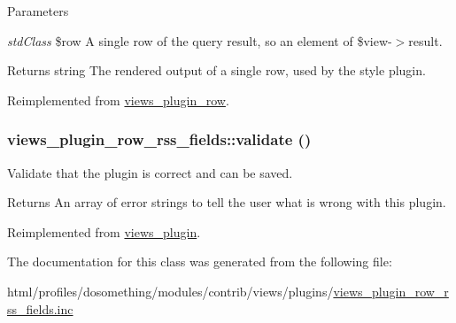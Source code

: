 \begin{DoxyParams}{Parameters}
\item[{\em stdClass}]\$row A single row of the query result, so an element of \$view-\/$>$result.\end{DoxyParams}
\begin{DoxyReturn}{Returns}
string The rendered output of a single row, used by the style plugin. 
\end{DoxyReturn}


Reimplemented from \hyperlink{classviews__plugin__row_a8243842e087dd28664b32cef0309f2a6}{views\_\-plugin\_\-row}.\hypertarget{classviews__plugin__row__rss__fields_ac4f5e75bc5a2277ed9041c18a3f2926d}{
\subsubsection[{validate}]{\setlength{\rightskip}{0pt plus 5cm}views\_\-plugin\_\-row\_\-rss\_\-fields::validate ()}}
\label{classviews__plugin__row__rss__fields_ac4f5e75bc5a2277ed9041c18a3f2926d}
Validate that the plugin is correct and can be saved.

\begin{DoxyReturn}{Returns}
An array of error strings to tell the user what is wrong with this plugin. 
\end{DoxyReturn}


Reimplemented from \hyperlink{classviews__plugin_aaf004b6a719837f08a1ffe4a1cf4d442}{views\_\-plugin}.

The documentation for this class was generated from the following file:\begin{DoxyCompactItemize}
\item 
html/profiles/dosomething/modules/contrib/views/plugins/\hyperlink{views__plugin__row__rss__fields_8inc}{views\_\-plugin\_\-row\_\-rss\_\-fields.inc}\end{DoxyCompactItemize}
